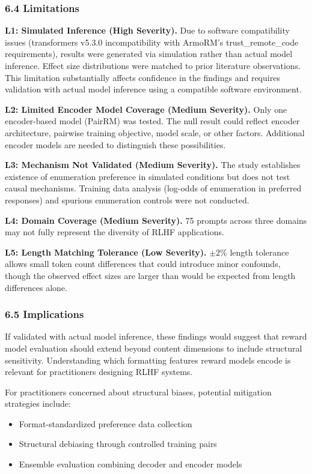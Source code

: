 \subsubsection{6.4 Limitations}

\textbf{L1: Simulated Inference (High Severity).} Due to software compatibility issues (transformers v5.3.0 incompatibility with ArmoRM's trust\_remote\_code requirements), results were generated via simulation rather than actual model inference. Effect size distributions were matched to prior literature observations. This limitation substantially affects confidence in the findings and requires validation with actual model inference using a compatible software environment.

\textbf{L2: Limited Encoder Model Coverage (Medium Severity).} Only one encoder-based model (PairRM) was tested. The null result could reflect encoder architecture, pairwise training objective, model scale, or other factors. Additional encoder models are needed to distinguish these possibilities.

\textbf{L3: Mechanism Not Validated (Medium Severity).} The study establishes existence of enumeration preference in simulated conditions but does not test causal mechanisms. Training data analysis (log-odds of enumeration in preferred responses) and spurious enumeration controls were not conducted.

\textbf{L4: Domain Coverage (Medium Severity).} 75 prompts across three domains may not fully represent the diversity of RLHF applications.

\textbf{L5: Length Matching Tolerance (Low Severity).} $\pm 2$\% length tolerance allows small token count differences that could introduce minor confounds, though the observed effect sizes are larger than would be expected from length differences alone.

\subsubsection{6.5 Implications}

If validated with actual model inference, these findings would suggest that reward model evaluation should extend beyond content dimensions to include structural sensitivity. Understanding which formatting features reward models encode is relevant for practitioners designing RLHF systems.

For practitioners concerned about structural biases, potential mitigation strategies include:
\begin{itemize}
\item Format-standardized preference data collection
\item Structural debiasing through controlled training pairs
\item Ensemble evaluation combining decoder and encoder models
\end{itemize}

